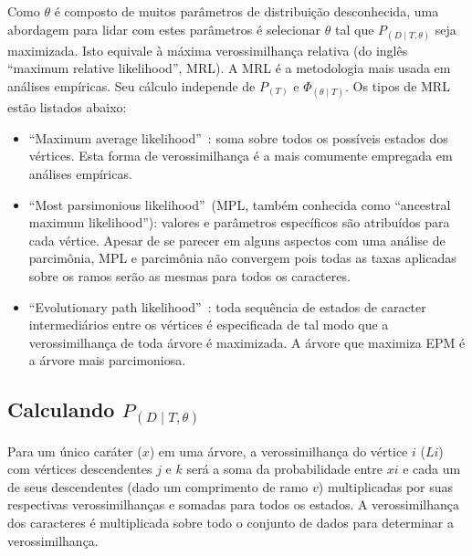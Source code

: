 \begin{refsection}
Como $\theta$ é composto de muitos parâmetros de distribuição desconhecida, uma abordagem para lidar com estes parâmetros é selecionar $\theta$ tal que $P_{(D \mid T,\theta)}$ seja maximizada. Isto equivale à máxima verossimilhança relativa (do inglês ``maximum relative likelihood'', MRL). A MRL é a metodologia mais usada em análises empíricas. Seu cálculo independe de $P_{(T)}$ e $\Phi_{(\theta \mid T)}$. Os tipos de MRL estão listados abaixo:

\begin{itemize}
\item ``Maximum average likelihood''~\parencite[MAL, ][]{Barry&Hartigan1987}: soma sobre todos os possíveis estados dos vértices. Esta forma de verossimilhança é a mais comumente empregada em análises empíricas.
\item ``Most parsimonious likelihood''~(MPL, também conhecida como ``ancestral maximum likelihood''): valores e parâmetros específicos são atribuídos para cada vértice. Apesar de se parecer em alguns aspectos com uma análise de parcimônia, MPL e parcimônia não convergem pois todas as taxas aplicadas sobre os ramos serão as mesmas para todos os caracteres.
\item ``Evolutionary path likelihood''~\parencite[EPL, ][]{Farris1973EPL}: toda sequência de estados de caracter intermediários entre os vértices é especificada de tal modo que a verossimilhança de toda árvore é maximizada. A árvore que maximiza EPM é a árvore mais parcimoniosa.
\end{itemize}

%


\subsection{Calculando $P_{(D \mid T,\theta)}$}

Para um único caráter ($x$) em uma árvore, a verossimilhança do vértice $i$ ($Li$) com vértices descendentes $j$ e $k$ será a soma da probabilidade entre $xi$ e cada um de seus descendentes (dado um comprimento de ramo $v$) multiplicadas por suas respectivas verossimilhanças e somadas para todos os estados. A verossimilhança dos caracteres é multiplicada sobre todo o conjunto de dados para determinar a verossimilhança.


\end{refsection}
